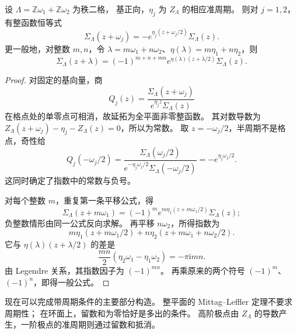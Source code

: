 \begin{proposition}\label{b3:prop:22-sigma-quasiperiods}
设 \(\Lambda=\mathbb Z\omega_1+\mathbb Z\omega_2\) 为秩二格，
基正向，\(\eta_j\) 为 \(Z_\Lambda\) 的相应准周期。
则对 \(j=1,2\)，有整函数恒等式
\[
 \Sigma_\Lambda(z+\omega_j)
 =-e^{\eta_j(z+\omega_j/2)}\Sigma_\Lambda(z).
\]
更一般地，对整数 \(m,n\)，令
\(\lambda=m\omega_1+n\omega_2\)、\(\eta(\lambda)=m\eta_1+n\eta_2\)，则
\[
 \Sigma_\Lambda(z+\lambda)
 =(-1)^{m+n+mn}
   e^{\eta(\lambda)(z+\lambda/2)}\Sigma_\Lambda(z).
\]
\end{proposition}
\begin{proof}
对固定的基向量，商
\[
 Q_j(z)=\frac{\Sigma_\Lambda(z+\omega_j)}
              {e^{\eta_jz}\Sigma_\Lambda(z)}
\]
在格点处的单零点可相消，故延拓为全平面非零整函数。
其对数导数为
\(Z_\Lambda(z+\omega_j)-\eta_j-Z_\Lambda(z)=0\)，所以为常数。
取 \(z=-\omega_j/2\)，半周期不是格点，奇性给
\[
 Q_j(-\omega_j/2)
 =\frac{\Sigma_\Lambda(\omega_j/2)}
        {e^{-\eta_j\omega_j/2}\Sigma_\Lambda(-\omega_j/2)}
 =-e^{\eta_j\omega_j/2}.
\]
这同时确定了指数中的常数与负号。

对每个整数 \(m\)，重复第一条平移公式，得
\[
 \Sigma_\Lambda(z+m\omega_1)
 =(-1)^m e^{m\eta_1(z+m\omega_1/2)}\Sigma_\Lambda(z);
\]
负整数情形由同一公式反向求解。
再平移 \(n\omega_2\)，所得指数为
\[
 m\eta_1(z+m\omega_1/2)
 +n\eta_2(z+m\omega_1+n\omega_2/2).
\]
它与 \(\eta(\lambda)(z+\lambda/2)\) 的差是
\[
 \frac{mn}{2}(\eta_2\omega_1-\eta_1\omega_2)
 =-\pi\mathrm i mn.
\]
由 Legendre 关系，其指数因子为 \((-1)^{mn}\)。
再乘原来的两个符号 \((-1)^m\)、\((-1)^n\)，即得一般公式。
\end{proof}

现在可以完成带周期条件的主要部分构造。
整平面的 Mittag--Leffler 定理不要求周期性；
在环面上，留数和为零恰好是多出的条件。
高阶极点由 \(Z_\Lambda\) 的导数产生，一阶极点的准周期则通过留数和抵消。

